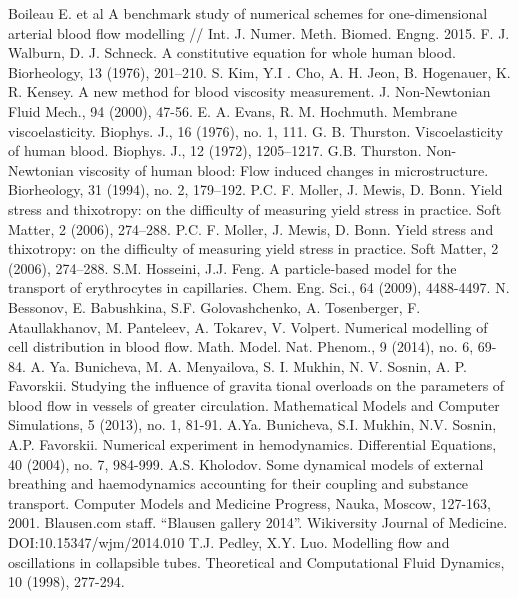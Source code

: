 \documentclass[a4paper, 14pt]{article}
\begin{document}
\newpage
{}
\begin{thebibliography}{}
      Boileau E. et al A benchmark study of numerical schemes for one-dimensional arterial blood flow modelling // Int. J. Numer. Meth. Biomed. Engng. 2015.
     F. J. Walburn, D. J. Schneck. A constitutive equation for whole human blood. Biorheology, 13 (1976), 201–210.
     S. Kim, Y.I . Cho, A. H. Jeon, B. Hogenauer, K. R. Kensey. A new method for blood viscosity measurement. J. Non-Newtonian Fluid Mech., 94 (2000), 47-56.
      E. A. Evans, R. M. Hochmuth. Membrane viscoelasticity. Biophys. J., 16 (1976), no. 1, 111.
     G. B. Thurston. Viscoelasticity of human blood. Biophys. J., 12 (1972), 1205–1217.
     G.B. Thurston. Non-Newtonian viscosity of human blood: Flow induced changes in microstructure. Biorheology, 31 (1994), no. 2, 179–192.
     P.C. F. Moller, J. Mewis, D. Bonn. Yield stress and thixotropy: on the difficulty of measuring yield stress in practice. Soft Matter, 2 (2006), 274–288.
      P.C. F. Moller, J. Mewis, D. Bonn. Yield stress and thixotropy: on the difficulty of measuring yield stress in practice. Soft Matter, 2 (2006), 274–288.
      S.M. Hosseini, J.J. Feng. A particle-based model for the transport of erythrocytes in capillaries. Chem. Eng. Sci., 64 (2009), 4488-4497.
     N. Bessonov, E. Babushkina, S.F. Golovashchenko, A. Tosenberger, F. Ataullakhanov, M. Panteleev, A. Tokarev, V. Volpert. Numerical modelling of cell distribution in blood flow. Math. Model. Nat. Phenom., 9 (2014), no. 6, 69-84.
     A. Ya. Bunicheva, M. A. Menyailova, S. I. Mukhin, N. V. Sosnin, A. P. Favorskii. Studying the influence of gravitational overloads on the parameters of blood flow in vessels of greater circulation. Mathematical Models and Computer Simulations, 5 (2013), no. 1, 81-91.
     A.Ya. Bunicheva, S.I. Mukhin, N.V. Sosnin, A.P. Favorskii. Numerical experiment in hemodynamics. Differential Equations, 40 (2004), no. 7, 984-999.
     A.S. Kholodov. Some dynamical models of external breathing and haemodynamics accounting for their coupling and substance transport. Computer Models and Medicine Progress, Nauka, Moscow, 127-163, 2001.
     Blausen.com staff. “Blausen gallery 2014”. Wikiversity Journal of Medicine. DOI:10.15347/wjm/2014.010
     T.J. Pedley, X.Y. Luo. Modelling flow and oscillations in collapsible tubes. Theoretical and Computational Fluid Dynamics, 10 (1998), 277-294.

\end{thebibliography}
\end{document}
